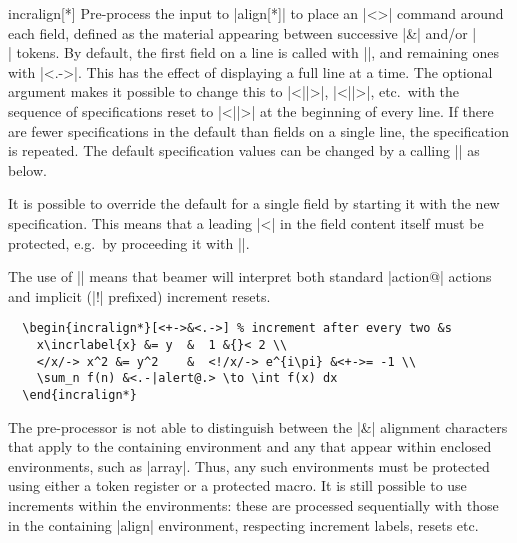 \documentclass[a4paper]{ltxdoc}
\begin{document}
\begin{environment}{{incralign[*]}}
    Pre-process the input to |align[*]| to place an |\action<>{}| command around
    each field, defined as the material appearing between successive |&| and/or
    |\\| tokens.  By default, the first field on a line is called with
    |\action<+->{}|, and remaining ones with ||.  This has the
    effect of displaying a full line at a time.  The optional argument makes it
    possible to change this to |\action<||>|,
    |\action<||>|, etc.\ with the sequence of specifications
    reset to |<||>| at the beginning of every line. If there are fewer
    specifications in the default than fields on a single line, the
    specification is repeated.  The default specification values can be changed
    by a calling |\incraligndefaultspec| as below.

    It is possible to override the default for a single field by starting it
    with the new specification.  This means that a leading |<| in the field
    content itself must be protected, e.g.\ by proceeding it with |{}|.

    The use of |\action| means that beamer will interpret both standard
    |action@| actions and implicit (|!| prefixed) increment
    resets.

    \example
\begin{verbatim}
  \begin{incralign*}[<+->&<.->] % increment after every two &s
    x\incrlabel{x} &= y  &  1 &{}< 2 \\
    </x/-> x^2 &= y^2    &  <!/x/-> e^{i\pi} &<+->= -1 \\
    \sum_n f(n) &<.-|alert@.> \to \int f(x) dx
  \end{incralign*}
\end{verbatim}
    
    The pre-processor is not able to distinguish between the |&| alignment
    characters that apply to the containing environment and any that appear
    within enclosed environments, such as |array|.  Thus, any such environments
    must be protected using either a token register or a protected macro.  It is
    still possible to use increments within the environments: these are
    processed sequentially with those in the containing |align| environment,
    respecting increment labels, resets etc.


\end{environment}
\end{document}
